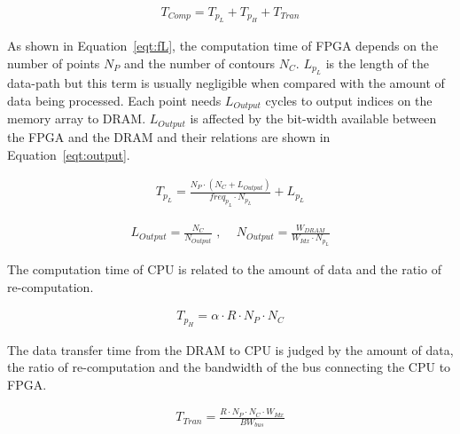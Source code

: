 \begin{equation}
\begin{aligned}
T_{Comp} = T_{p_L} + T_{p_H} + T_{Tran}
\end{aligned}
\label{eqt:fM}
\end{equation}

As shown in Equation~\ref{eqt:fL}, the computation time of FPGA depends on the number of points $N_P$ and the number of contours $N_C$.
$L_{p_L}$ is the length of the data-path but this term is usually negligible when compared with the amount of data being processed.
Each point needs $L_{Output}$ cycles to output indices on the memory array to DRAM.
$L_{Output}$ is affected by the bit-width available between the FPGA and the DRAM and their relations are shown in Equation~\ref{eqt:output}.

\begin{equation}
\begin{aligned}
T_{p_L} = \frac{N_P \cdot (N_C+L_{Output})}{freq_{p_L} \cdot N_{p_L}} + L_{p_L}
\end{aligned}
\label{eqt:fL}
\end{equation}

\begin{equation}
\begin{aligned}
L_{Output} = \frac{N_C}{N_{Output}} \mbox{ , } \quad
N_{Output} = \frac{W_{DRAM}}{W_{Idx} \cdot N_{p_L}}
\end{aligned}
\label{eqt:output}
\end{equation}

The computation time of CPU is related to the amount of data and the ratio of re-computation.

\begin{equation}
\begin{aligned}
T_{p_H} = \alpha \cdot R \cdot N_P \cdot N_C
\end{aligned}
\label{eqt:fH}
\end{equation}

The data transfer time from the DRAM to CPU is judged by the amount of data, the ratio of re-computation and the bandwidth of the bus connecting the CPU to FPGA.

\begin{equation}
\begin{aligned}
T_{Tran} = \frac{R \cdot N_P \cdot N_C \cdot W_{Idx}}{BW_{bus}}
\end{aligned}
\label{eqt:tran}
\end{equation}

